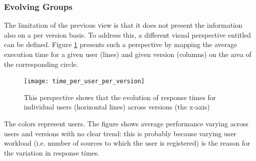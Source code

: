 \subsubsection*{Evolving Groups}
The limitation of the previous view is that it does not present the information also on a per version basis. To address this, a different visual perspective entitled  can be defined. Figure \ref{fig:tuv} presents such a perspective by mapping the average execution time for a given user (lines) and given version (columns) on the area of the corresponding circle. 

\begin{figure}[h!]
  \centering
  \texttt{[image: time\_per\_user\_per\_version]}
  \caption{This perspective shows that the evolution of response times for individual users (horizontal lines) across versions (the x-axis)}
  \label{fig:tuv}
\end{figure}


The colors represent users. The figure shows average performance varying  across users and versions with no clear trend: this is probably because varying user workload (i.e. number of sources to which the user is registered) is the reason for the variation in response times. 


  
